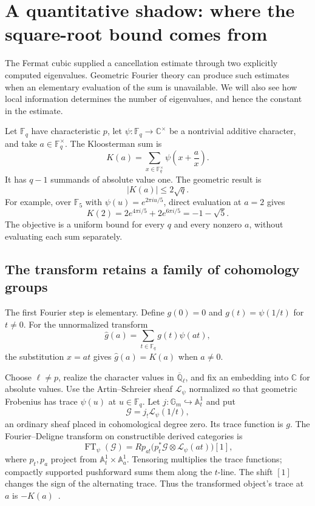 \documentclass[11pt]{article}
\theoremstyle{remark}
\begin{document}
\section{A quantitative shadow: where the square-root bound comes from}
\label{estimate:section}

The Fermat cubic supplied a cancellation estimate through two explicitly computed eigenvalues. Geometric Fourier theory can produce such estimates when an elementary evaluation of the sum is unavailable. We will also see how local information determines the number of eigenvalues, and hence the constant in the estimate.

Let \(\mathbb F_q\) have characteristic \(p\), let \(\psi:\mathbb F_q\to\mathbb C^\times\) be a nontrivial additive character, and take \(a\in\mathbb F_q^\times\). The Kloosterman sum is
\begin{equation}
K(a)=\sum_{x\in\mathbb F_q^\times}
\psi\!\left(x+\frac ax\right).
\label{estimate:kloosterman}
\end{equation}
It has \(q-1\) summands of absolute value one. The geometric result is
\begin{equation}
\boxed{|K(a)|\le2\sqrt q.}
\label{estimate:bound}
\end{equation}
For example, over \(\mathbb F_5\) with \(\psi(u)=e^{2\pi iu/5}\), direct evaluation at \(a=2\) gives
\[
K(2)=2e^{4\pi i/5}+2e^{6\pi i/5}=-1-\sqrt5.
\]
The objective is a uniform bound for every \(q\) and every nonzero \(a\), without evaluating each sum separately.

\subsection{The transform retains a family of cohomology groups}

The first Fourier step is elementary. Define \(g(0)=0\) and \(g(t)=\psi(1/t)\) for \(t\ne0\). For the unnormalized transform
\[
\widehat g(a)=\sum_{t\in\mathbb F_q}g(t)\psi(at),
\]
the substitution \(x=at\) gives \(\widehat g(a)=K(a)\) when \(a\ne0\).

Choose \(\ell\ne p\), realize the character values in \(\overline{\mathbb Q}_\ell\), and fix an embedding into \(\mathbb C\) for absolute values. Use the Artin--Schreier sheaf \(\mathcal L_\psi\) normalized so that geometric Frobenius has trace \(\psi(u)\) at \(u\in\mathbb F_q\). Let \(j:\mathbb G_m\hookrightarrow\mathbb A^1_t\) and put
\[
\mathcal G=j_!\mathcal L_\psi(1/t),
\]
an ordinary sheaf placed in cohomological degree zero. Its trace function is \(g\). The Fourier--Deligne transform on constructible derived categories is
\begin{equation}
\operatorname{FT}_\psi(\mathcal G)
=Rp_{a!}\bigl(p_t^*\mathcal G\otimes
\mathcal L_\psi(at)\bigr)[1],
\label{estimate:fourier-deligne}
\end{equation}
where \(p_t,p_a\) project from \(\mathbb A^1_t\times\mathbb A^1_a\). Tensoring multiplies the trace functions; compactly supported pushforward sums them along the \(t\)-line. The shift \([1]\) changes the sign of the alternating trace. Thus the transformed object's trace at \(a\) is \(-K(a)\)~\cite{laumon}.
\end{document}
